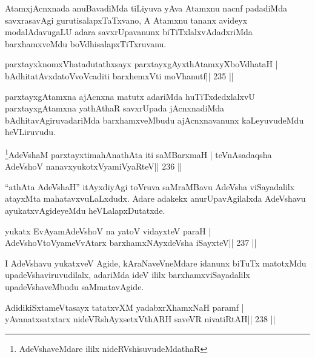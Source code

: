 \begin{artha}
AtamxjAcnxnada anuBavadiMda tiLiyuva yAva Atamxnu nacnf padadiMda savxrasavAgi gurutisalapxTaTxvano, A Atamxnu tananx avideyx modalAdavugaLU adara savxrUpavanunx biTiTxlalxvAdadxriMda barxhamxveMdu boVdhisalapxTiTxruvanu.
\end{artha}

\begin{shl}
parxtayxknomxVhatadutathxsayx parxtayxgAyxthAtamxyXboVdhataH |
bAdhitatAvxdatoV\s voVcaditi barxhemxVti moVhanutf\hfill || 235 ||
\end{shl}

\begin{artha}
parxtayxgAtamxna ajAcnxna matutx adariMda huTiTxdedxlalxvU parxtayxgAtamxna yathAthaR savxrUpada jAcnxnadiMda bAdhitavAgiruvadariMda barxhamxveMbudu ajAcnxnavanunx kaLeyuvudeMdu heVLiruvudu.
\end{artha}



\begin{shl}
\footnote{AdeVshaveMdare ililx nideRVshisuvudeMdathaR}AdeVshaM parxtayxtimahAnathAta iti saMBarxmaH |
teVnAsadaqsha AdeVshoV nanavxyukotxV\s yamiVyaRteV\hfill || 236 ||
\end{shl}

\begin{artha}
``athAta AdeVshaH'' itAyxdiyAgi toVruva saMraMBavu AdeVsha
  viSayadalilx atayxMta mahatavxvuLaLxdudx. Adare adakekx
  anurUpavAgilalxda AdeVshavu ayukatxvAgideyeMdu heVLalapxDutatxde.
\end{artha}


\begin{shl}
yukatx EvAyamAdeVshoV na yatoV vidayxteV paraH |
AdeVshoV\s toV\s yameVvAtarx barxhamxNAyxdeVsha iSayxteV\hfill || 237 ||
\end{shl}

\begin{artha}
I AdeVshavu yukatxveV Agide, kAraNaveVneMdare idanunx biTuTx matotxMdu upadeVshaviruvudilalx, adariMda ideV ililx barxhamxviSayadalilx upadeVshaveMbudu saMmatavAgide.
\end{artha}

\begin{shl}
AdidikiSxtameVtasayx tatatxvXM yadabxrXhamxNaH paramf |
yAvanatxsatxtarx nideVRshAyxsetxV\s thARH saveVR nivatiRtAH\hfill || 238 ||
\end{shl}

